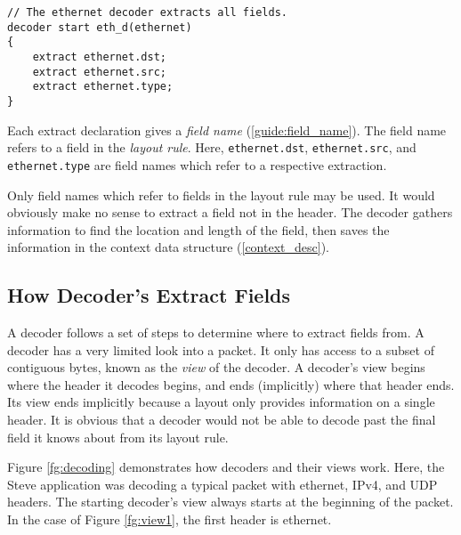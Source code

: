 \begin{codepage}
\begin{lstlisting}
// The ethernet decoder extracts all fields.
decoder start eth_d(ethernet)
{
	extract ethernet.dst;
	extract ethernet.src;
	extract ethernet.type;
}
\end{lstlisting}
\end{codepage}

Each extract declaration gives a \textit{field name} (\ref{guide:field_name}).
The field name refers to a field in the \textit{layout rule}. Here,
\texttt{ethernet.dst}, \texttt{ethernet.src}, and \texttt{ethernet.type} are
field names which refer to a respective extraction.

Only field names which refer to fields in the layout rule may be used. It would
obviously make no sense to extract a field not in the header. The decoder
gathers information to find the location and length of the field, then saves the information
in the context data structure (\ref{context_desc}).

\subsection{How Decoder's Extract Fields} \label{tut:extract_how}

A decoder follows a set of steps to determine where to extract fields from. A decoder has a very limited look into a packet. It only has
access to a subset of contiguous bytes, known as the \textit{view} of the
decoder. A decoder's view begins where the header it decodes begins, and ends
(implicitly) where that header ends. Its view ends implicitly because a layout
only provides information on a single header. It is obvious that a
decoder would not be able to decode past the final field it knows about from its
layout rule.

Figure \ref{fg:decoding} demonstrates how decoders and their views work. Here, the Steve application was decoding a typical packet with ethernet, IPv4, and UDP headers. The
starting decoder's view always starts at the beginning of the packet. In the
case of Figure \ref{fg:view1}, the first header is ethernet.

